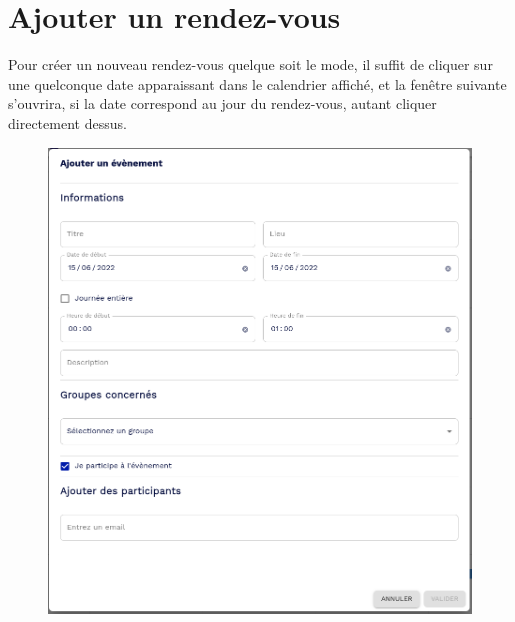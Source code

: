 \section{Ajouter un rendez-vous}
Pour créer un nouveau rendez-vous quelque soit le mode, il suffit de cliquer sur une quelconque date apparaissant dans le calendrier affiché, et la fenêtre suivante s'ouvrira, si la date correspond au jour du rendez-vous, autant cliquer directement dessus.
\begin{figure}
	\centering
	\includegraphics[width=0.500\linewidth]{./Captures/agenda.neo.rdv.png}
\end{figure}

